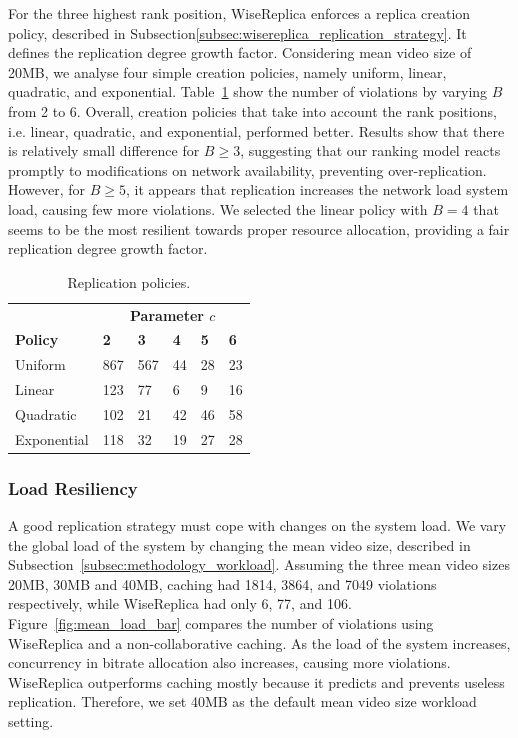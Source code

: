 For the three highest rank position, WiseReplica enforces a replica creation policy, described in Subsection\ref{subsec:wisereplica_replication_strategy}. It defines the replication degree growth factor. Considering mean video size of 20MB, we analyse four simple creation policies, namely uniform, linear, quadratic, and exponential.  Table~\ref{tab:creation_policies} show the number of violations by varying $B$ from 2 to 6. Overall, creation policies that take into account the rank positions, i.e. linear, quadratic, and exponential, performed better. Results show that there is relatively small difference for $B\ge 3$, suggesting that our ranking model reacts promptly to modifications on network availability, preventing over-replication. However, for $B\ge 5$, it appears that replication increases the network load system load, causing few more violations. We selected the linear policy with $B=4$ that seems to be the most resilient towards proper resource allocation, providing a fair replication degree growth factor.

\begin{table}
  \label{tab:motivation_advanced_encodings}
	\begin{center}
		\caption{Replication policies.}
  		\label{tab:creation_policies}
		\begin{tabular}{p{1.2cm} || p{1cm} p{1cm} p{1cm} p{1cm} p{1cm}}
			&\multicolumn{5}{c}{{\bf Parameter $c$}}\\
			{\bf Policy}&{\bf 2}&{\bf 3}&{\bf 4}&{\bf 5}&{\bf 6}\\
			\hline
			\hline
			Uniform&867&567&\cellcolor{blue!25}44&28&23\\
			\cellcolor{blue!25}Linear&\cellcolor{blue!25}123&\cellcolor{blue!25}77&\cellcolor{blue!25}6&\cellcolor{blue!25}9&\cellcolor{blue!25}16\\
			Quadratic&102&21&\cellcolor{blue!25}42&46&58\\
			Exponential&118&32&\cellcolor{blue!25}19&27&28\\
		\end{tabular}
	\end{center}
\end{table}

\subsubsection{Load Resiliency}

A good replication strategy must cope with changes on the system load.  We vary the global load of the system by changing the mean video size, described in Subsection~\ref{subsec:methodology_workload}. Assuming the three mean video sizes 20MB, 30MB and 40MB, caching had 1814, 3864, and 7049 violations respectively, while WiseReplica had only 6, 77, and 106. Figure~\ref{fig:mean_load_bar} compares the number of violations using WiseReplica and a non-collaborative caching. As the load of the system increases, concurrency in bitrate allocation also increases, causing more violations. WiseReplica outperforms caching mostly because it predicts and prevents useless replication. Therefore, we set 40MB as the default mean video size workload setting.

